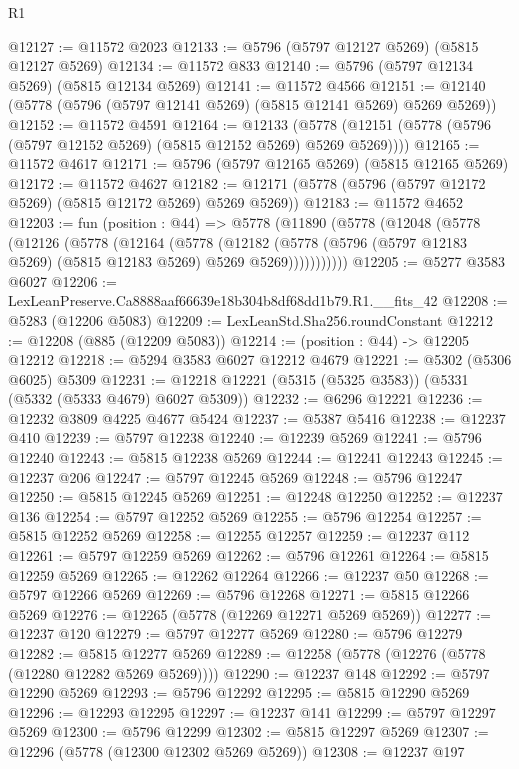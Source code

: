 \begin{lexlean}{R1}
\begin{coremodule}
@12127 := @11572 @2023
@12133 := @5796 (@5797 @12127 @5269) (@5815 @12127 @5269)
@12134 := @11572 @833
@12140 := @5796 (@5797 @12134 @5269) (@5815 @12134 @5269)
@12141 := @11572 @4566
@12151 := @12140 (@5778 (@5796 (@5797 @12141 @5269) (@5815 @12141 @5269) @5269 @5269))
@12152 := @11572 @4591
@12164 := @12133
    (@5778 (@12151 (@5778 (@5796 (@5797 @12152 @5269) (@5815 @12152 @5269) @5269 @5269))))
@12165 := @11572 @4617
@12171 := @5796 (@5797 @12165 @5269) (@5815 @12165 @5269)
@12172 := @11572 @4627
@12182 := @12171 (@5778 (@5796 (@5797 @12172 @5269) (@5815 @12172 @5269) @5269 @5269))
@12183 := @11572 @4652
@12203 := fun (position : @44) =>
  @5778
    (@11890
      (@5778
        (@12048
          (@5778
            (@12126
              (@5778
                (@12164
                  (@5778
                    (@12182
                      (@5778 (@5796 (@5797 @12183 @5269) (@5815 @12183 @5269) @5269 @5269)))))))))))
@12205 := @5277 @3583 @6027
@12206 := LexLeanPreserve.Ca8888aaf66639e18b304b8df68dd1b79.R1.__fits_42
@12208 := @5283 (@12206 @5083)
@12209 := LexLeanStd.Sha256.roundConstant
@12212 := @12208 (@885 (@12209 @5083))
@12214 := (position : @44) -> @12205 @12212
@12218 := @5294 @3583 @6027 @12212 @4679
@12221 := @5302 (@5306 @6025) @5309
@12231 := @12218 @12221 (@5315 (@5325 @3583)) (@5331 (@5332 (@5333 @4679) @6027 @5309))
@12232 := @6296 @12221
@12236 := @12232 @3809 @4225 @4677 @5424
@12237 := @5387 @5416
@12238 := @12237 @410
@12239 := @5797 @12238
@12240 := @12239 @5269
@12241 := @5796 @12240
@12243 := @5815 @12238 @5269
@12244 := @12241 @12243
@12245 := @12237 @206
@12247 := @5797 @12245 @5269
@12248 := @5796 @12247
@12250 := @5815 @12245 @5269
@12251 := @12248 @12250
@12252 := @12237 @136
@12254 := @5797 @12252 @5269
@12255 := @5796 @12254
@12257 := @5815 @12252 @5269
@12258 := @12255 @12257
@12259 := @12237 @112
@12261 := @5797 @12259 @5269
@12262 := @5796 @12261
@12264 := @5815 @12259 @5269
@12265 := @12262 @12264
@12266 := @12237 @50
@12268 := @5797 @12266 @5269
@12269 := @5796 @12268
@12271 := @5815 @12266 @5269
@12276 := @12265 (@5778 (@12269 @12271 @5269 @5269))
@12277 := @12237 @120
@12279 := @5797 @12277 @5269
@12280 := @5796 @12279
@12282 := @5815 @12277 @5269
@12289 := @12258 (@5778 (@12276 (@5778 (@12280 @12282 @5269 @5269))))
@12290 := @12237 @148
@12292 := @5797 @12290 @5269
@12293 := @5796 @12292
@12295 := @5815 @12290 @5269
@12296 := @12293 @12295
@12297 := @12237 @141
@12299 := @5797 @12297 @5269
@12300 := @5796 @12299
@12302 := @5815 @12297 @5269
@12307 := @12296 (@5778 (@12300 @12302 @5269 @5269))
@12308 := @12237 @197

\end{coremodule}
\end{lexlean}
